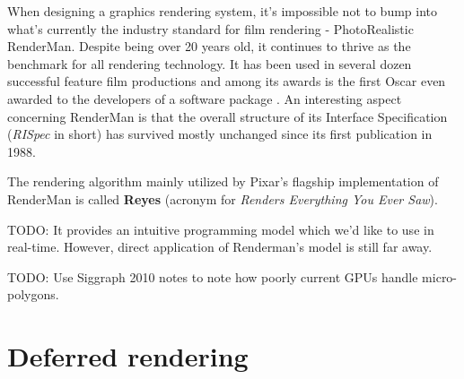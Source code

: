 When designing a graphics rendering system, it's impossible not to bump into what's currently the industry standard for film rendering - PhotoRealistic RenderMan. Despite being over 20 years old, it continues to thrive as the benchmark for all rendering technology. It has been used in several dozen successful feature film productions and among its awards is the first Oscar even awarded to the developers of a software package \cite{RenderManAwards}. An interesting aspect concerning RenderMan is that the overall structure of its Interface Specification (\emph{RISpec} in short) has survived mostly unchanged since its first publication in 1988.

The rendering algorithm mainly utilized by Pixar's flagship implementation of RenderMan is called \textbf{Reyes} (acronym for \emph{Renders Everything You Ever Saw}).

TODO: It provides an intuitive programming model which we'd like to use in real-time. However, direct application of Renderman's model is still far away.

TODO: Use Siggraph 2010 notes to note how poorly current GPUs handle micro-polygons.

\section{Deferred rendering}

